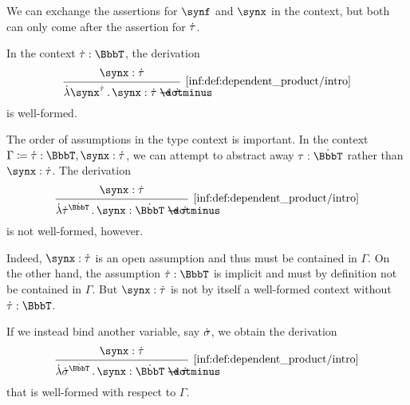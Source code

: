 \begin{example}
\begin{thmenum}
    We can exchange the assertions for \( \synf \) and \( \synx \) in the context, but both can only come after the assertion for \( \dot{\tau} \).

     In the context \( \syn\tau: \BbbT \), the derivation
    \begin{equation*}
      \begin{prooftree}
        \hypo{ \synx: \syn\tau }
        \infer1[\ref{inf:def:dependent_product/intro}]{ \qabs {\synx^{\syn\tau}} \synx: \syn\tau \synimplies \syn\tau }
      \end{prooftree}
    \end{equation*}
    is well-formed.

    The order of assumptions in the type context is important. In the context \( \Gamma \coloneqq \syn\tau: \BbbT, \synx: \syn\tau \), we can attempt to abstract away \( \tau: \syn\BbbT \) rather than \( \synx: \syn\tau \). The derivation
    \begin{equation*}
      \begin{prooftree}
        \hypo{ \synx: \syn\tau }
        \infer1[\ref{inf:def:dependent_product/intro}]{ \qabs {\syn\tau^{\syn\BbbT}} \synx: \syn\BbbT \synimplies \syn\tau }
      \end{prooftree}
    \end{equation*}
    is not well-formed, however.

    Indeed, \( \synx: \syn\tau \) is an open assumption and thus must be contained in \( \Gamma \). On the other hand, the assumption \( \syn\tau: \BbbT \) is implicit and must by definition not be contained in \( \Gamma \). But \( \synx: \syn\tau \) is not by itself a well-formed context without \( \syn\tau: \BbbT \).

    If we instead bind another variable, say \( \dot{\sigma} \), we obtain the derivation
    \begin{equation*}
      \begin{prooftree}
        \hypo{ \synx: \syn\tau }
        \infer1[\ref{inf:def:dependent_product/intro}]{ \qabs {\syn\sigma^{\syn\BbbT}} \synx: \syn\BbbT \synimplies \syn\tau }
      \end{prooftree}
    \end{equation*}
    that is well-formed with respect to \( \Gamma \).
  \end{thmenum}
\end{example}

